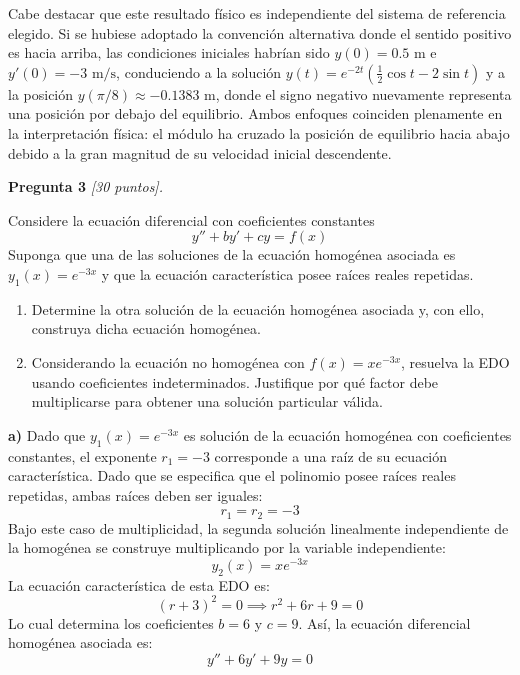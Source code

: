 \documentclass[12pt,letterpaper]{article}
\begin{document}
Cabe destacar que este resultado físico es independiente del sistema de referencia elegido. Si se hubiese adoptado la convención alternativa donde el sentido positivo es hacia arriba, las condiciones iniciales habrían sido $y(0) = 0.5\text{ m}$ e $y'(0) = -3\text{ m/s}$, conduciendo a la solución $y(t) = e^{-2t}\left(\frac{1}{2}\cos t - 2\sin t\right)$ y a la posición $y(\pi/8) \approx -0.1383\text{ m}$, donde el signo negativo nuevamente representa una posición por debajo del equilibrio. Ambos enfoques coinciden plenamente en la interpretación física: el módulo ha cruzado la posición de equilibrio hacia abajo debido a la gran magnitud de su velocidad inicial descendente.

\bigskip

\textbf{Pregunta 3} \textit{[30 puntos].}

Considere la ecuación diferencial con coeficientes constantes
\[
  y'' + by' + cy = f(x)
\]
Suponga que una de las soluciones de la ecuación homogénea asociada es $y_1(x) = e^{-3x}$ y que la ecuación característica posee raíces reales repetidas.

\begin{enumerate}[label=\alph*)]
  \item Determine la otra solución de la ecuación homogénea asociada y, con ello, construya dicha ecuación homogénea.
  \item Considerando la ecuación no homogénea con $f(x) = xe^{-3x}$, resuelva la EDO usando coeficientes indeterminados. Justifique por qué factor debe multiplicarse para obtener una solución particular válida.
\end{enumerate}

\medskip

\textbf{a)} Dado que $y_1(x) = e^{-3x}$ es solución de la ecuación homogénea con coeficientes constantes, el exponente $r_1 = -3$ corresponde a una raíz de su ecuación característica. Dado que se especifica que el polinomio posee raíces reales repetidas, ambas raíces deben ser iguales:
\[
  r_1 = r_2 = -3
\]
Bajo este caso de multiplicidad, la segunda solución linealmente independiente de la homogénea se construye multiplicando por la variable independiente:
\[
  y_2(x) = xe^{-3x}
\]
La ecuación característica de esta EDO es:
\[
  (r+3)^2 = 0 \implies r^2 + 6r + 9 = 0
\]
Lo cual determina los coeficientes $b = 6$ y $c = 9$. Así, la ecuación diferencial homogénea asociada es:
\[
  y'' + 6y' + 9y = 0
\]

\medskip
\end{document}
